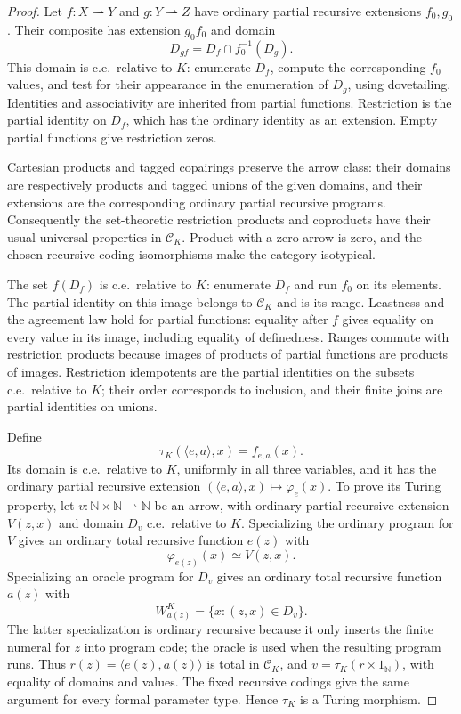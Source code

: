 \documentclass[11pt]{article}
\newcommand{\N}{\mathbb N}
\begin{document}
\begin{proof}
Let $f:X\rightharpoonup Y$ and $g:Y\rightharpoonup Z$ have
ordinary partial recursive extensions $f_0,g_0$. Their composite has
extension $g_0f_0$ and domain
\[
 D_{gf}=D_f\cap f_0^{-1}(D_g).
\]
This domain is c.e.\ relative to $K$: enumerate $D_f$, compute the
corresponding $f_0$-values, and test for their appearance in the
enumeration of $D_g$, using dovetailing. Identities and associativity
are inherited from partial functions. Restriction is the partial
identity on $D_f$, which has the ordinary identity as an extension.
Empty partial functions give restriction zeros.

Cartesian products and tagged copairings preserve the arrow class:
their domains are respectively products and tagged unions of the given
domains, and their extensions are the corresponding ordinary partial
recursive programs. Consequently the set-theoretic restriction
products and coproducts have their usual universal properties in
$\mathcal C_K$. Product with a zero arrow is zero, and the chosen
recursive coding isomorphisms make the category isotypical.

The set $f(D_f)$ is c.e.\ relative to $K$: enumerate $D_f$ and run
$f_0$ on its elements. The partial identity on this image belongs to
$\mathcal C_K$ and is its range. Leastness and the agreement law
hold for partial functions: equality after $f$ gives equality on
every value in its image, including equality of definedness.
Ranges commute with restriction products because images of products
of partial functions are products of images. Restriction idempotents
are the partial identities on the subsets c.e.\ relative to $K$;
their order corresponds to inclusion, and their finite joins are
partial identities on unions.

Define
\[
 \tau_K(\langle e,a\rangle,x)=f_{e,a}(x).
\]
Its domain is c.e.\ relative to $K$, uniformly in all three
variables, and it has the ordinary partial recursive extension
$(\langle e,a\rangle,x)\mapsto\varphi_e(x)$.
To prove its Turing property, let
$v:\N\times\N\rightharpoonup\N$ be an arrow, with ordinary
partial recursive extension $V(z,x)$ and domain $D_v$ c.e.\ relative
to $K$. Specializing the ordinary program for $V$ gives an ordinary
total recursive function $e(z)$ with
\[
 \varphi_{e(z)}(x)\simeq V(z,x).
\]
Specializing an oracle program for $D_v$ gives an ordinary total
recursive function $a(z)$ with
\[
 W_{a(z)}^K=\{x:(z,x)\in D_v\}.
\]
The latter specialization is ordinary recursive because it only
inserts the finite numeral for $z$ into program code; the oracle is
used when the resulting program runs. Thus
$r(z)=\langle e(z),a(z)\rangle$ is total in $\mathcal C_K$, and
$v=\tau_K(r\times1_{\N})$, with equality of domains and values.
The fixed recursive codings give the same argument for every formal
parameter type. Hence $\tau_K$ is a Turing morphism.


\end{proof}
\end{document}
